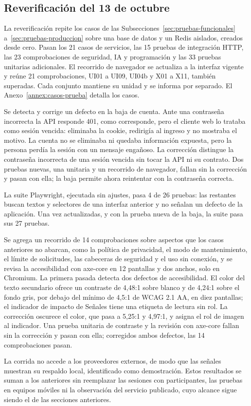 \subsection{Reverificación del 13 de octubre}\label{sec:reverificacion-octubre13}

La reverificación repite los casos de las Subsecciones~\ref{sec:pruebas-funcionales} a~\ref{sec:pruebas-produccion} sobre una base de datos y un Redis aislados, creados desde cero. Pasan los 21 casos de servicios, las 15 pruebas de integración HTTP, las 23 comprobaciones de seguridad, IA y programación y las 33 pruebas unitarias adicionales. El recorrido de navegador se actualiza a la interfaz vigente y reúne 21 comprobaciones, UI01 a UI09, UI04b y X01 a X11, también superadas. Cada conjunto mantiene su unidad y se informa por separado. El Anexo~\ref{annex:casos-prueba} detalla los casos.

Se detecta y corrige un defecto en la baja de cuenta. Ante una contraseña incorrecta la API responde 401, como corresponde, pero el cliente web lo trataba como sesión vencida: eliminaba la cookie, redirigía al ingreso y no mostraba el motivo. La cuenta no se eliminaba ni quedaba información expuesta, pero la persona perdía la sesión con un mensaje engañoso. La corrección distingue la contraseña incorrecta de una sesión vencida sin tocar la API ni su contrato. Dos pruebas nuevas, una unitaria y un recorrido de navegador, fallan sin la corrección y pasan con ella; la baja permite ahora reintentar con la contraseña correcta.

La suite Playwright, ejecutada sin ajustes, pasa 4 de 26 pruebas: las restantes buscan textos y selectores de una interfaz anterior y no señalan un defecto de la aplicación. Una vez actualizadas, y con la prueba nueva de la baja, la suite pasa sus 27 pruebas.

Se agrega un recorrido de 14 comprobaciones sobre aspectos que los casos anteriores no abarcan, como la política de privacidad, el modo de mantenimiento, el límite de solicitudes, las cabeceras de seguridad y el uso sin conexión, y se revisa la accesibilidad con axe-core en 12 pantallas y dos anchos, solo en Chromium. La primera pasada detecta dos defectos de accesibilidad. El color del texto secundario ofrece un contraste de 4,48:1 sobre blanco y de 4,24:1 sobre el fondo gris, por debajo del mínimo de 4,5:1 de WCAG 2.1 AA, en diez pantallas; el indicador de impacto de Señales tiene una etiqueta de lectura sin rol. La corrección oscurece el color, que pasa a 5,25:1 y 4,97:1, y asigna el rol de imagen al indicador. Una prueba unitaria de contraste y la revisión con axe-core fallan sin la corrección y pasan con ella; corregidos ambos defectos, las 14 comprobaciones pasan.

La corrida no accede a los proveedores externos, de modo que las señales muestran su respaldo local, identificado como demostración. Estos resultados se suman a los anteriores sin reemplazar las sesiones con participantes, las pruebas en equipos móviles ni la observación del servicio publicado, cuyo alcance sigue siendo el de las secciones anteriores.
